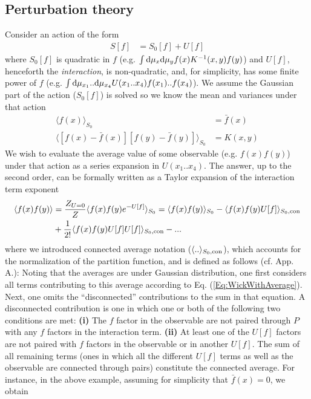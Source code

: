 \subsection{Perturbation theory}
\label{Sec:PT}
Consider an action of the form 
\begin{align}
S[f] &= S_0[f] + U[f]
\end{align}
where $S_0[f]$ is quadratic in $f$ (e.g. $\int \text{d}\mu_x \text{d}\mu_y f(x) K^{-1}(x,y) f(y)$) and $U[f]$, henceforth the {\it interaction}, is non-quadratic, and, for simplicity, has some finite power of $f$ (e.g. $\int \text{d}\mu_{x_1}..\text{d}\mu_{x_4}U(x_1..x_4) f(x_1)..f(x_4)$). We assume the Gaussian part of the action ($S_0[f]$) is solved so we know the mean and variances under that action 
\begin{align}
\langle f(x) \rangle_{S_0} &= \bar{f}(x) \\ \nonumber 
\langle [f(x)-\bar{f}(x)] [f(y)-\bar{f}(y)] \rangle_{S_0} &= K(x,y)
\end{align}
We wish to evaluate the average value of some observable (e.g. $f(x)f(y)$) under that action as a series expansion in $U(x_1..x_4)$. 
The answer, up to the second order, can be formally written as a Taylor expansion of the interaction term exponent
\begin{align}
\langle f(x) f(y) \rangle &= \frac{Z_{U=0}}{Z}\langle f(x) f(y) e^{-U[f]} \rangle_{S_0} = \langle f(x) f(y) \rangle_{S_0} - \langle f(x) f(y) U[f] \rangle_{S_0,\text{con}} \\ \nonumber &+ \frac{1}{2!} \langle f(x) f(y) U[f] U[f]\rangle_{S_0,\text{con}} - ...
\end{align}
where we introduced connected average notation ($\langle .. \rangle_{S_0,\text{con}}$), which accounts for the normalization of the partition function, and is defined as follows (cf. \citep{K_hn_2018} App. A.): Noting that the averages are under Gaussian distribution, one first considers all terms contributing to this average according to Eq. (\ref{Eq:WickWithAverage}). Next, one omits the ``disconnected'' contributions to the sum in that equation. A disconnected contribution is one in which one or both of the following two conditions are met: {\bf (i)} The $f$ factor in the observable are not paired through $P$ with any $f$ factors in the interaction term. {\bf (ii)} At least one of the $U[f]$ factors are not paired with $f$ factors in the observable or in another $U[f]$. The sum of all remaining terms (ones in which all the different $U[f]$ terms as well as the observable are connected through pairs) constitute the connected average. For instance, in the above example, assuming for simplicity that $\bar{f}(x)=0$, we obtain 
